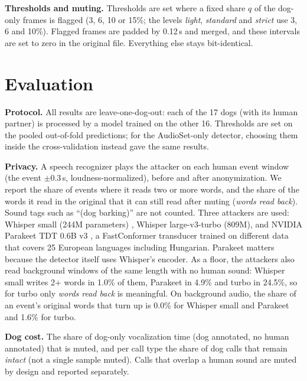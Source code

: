 \documentclass[10pt,twocolumn,a4paper]{article}
\begin{document}
\textbf{Thresholds and muting.} Thresholds are set where a fixed share $q$ of the dog-only frames is
flagged (3, 6, 10 or 15\%; the levels \emph{light}, \emph{standard} and \emph{strict} use 3, 6 and
10\%). Flagged frames are padded by 0.12\,s and merged, and these intervals are set to zero in the
original file. Everything else stays bit-identical.

\section{Evaluation}
\label{sec:eval}
\textbf{Protocol.} All results are leave-one-dog-out: each of the 17 dogs (with its human partner) is
processed by a model trained on the other 16. Thresholds are set on the pooled out-of-fold predictions; for the AudioSet-only
detector, choosing them inside the cross-validation instead gave the same results.

\textbf{Privacy.} A speech recognizer plays the attacker on each human event window (the event
$\pm$0.3\,s, loudness-normalized), before and after anonymization. We report the share of events where
it reads two or more words, and the share of the words it read in the original that it can still read
after muting (\emph{words read back}). Sound tags such as ``(dog barking)'' are not counted. Three
attackers are used: Whisper small (244M parameters) \cite{radford2023whisper}, Whisper large-v3-turbo
(809M), and NVIDIA Parakeet TDT 0.6B v3 \cite{nvidia2025parakeet}, a FastConformer transducer trained
on different data that covers 25 European languages including Hungarian. Parakeet matters because the
detector itself uses Whisper's encoder. As a floor, the attackers also read background windows of the
same length with no human sound: Whisper small writes 2+ words in 1.0\% of them, Parakeet in 4.9\% and
turbo in 24.5\%, so for turbo only \emph{words read back} is meaningful. On background audio, the
share of an event's original words that turn up is 0.0\% for Whisper small and Parakeet and 1.6\% for turbo.

\textbf{Dog cost.} The share of dog-only vocalization time (dog annotated, no human annotated) that is
muted, and per call type the share of dog calls that remain \emph{intact} (not a single sample muted).
Calls that overlap a human sound are muted by design and reported separately.
\end{document}
